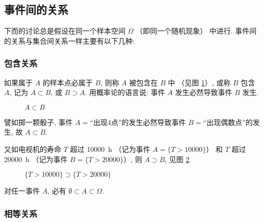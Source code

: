 \subsection{事件间的关系}

下而的讨论总是假设在同一个样本空间 $\Omega$ （即同一个随机现象） 中进行.
事件间的关系与集合间关系一样主要有以下几种:

\subsubsection{包含关系}

如果属于 $A$ 的样本点必属于 $B$,
则称 $A$ 被包含在 $B$ 中 （见图 \ref{fig1.1.2}）,
或称 $B$ 包含 $A$,
记为 $A \subset B$,
或 $B \supset A$.
用概率论的语言说:
事件 $A$ 发生必然导致事件 $B$ 发生.

\begin{figure}[!ht]
  \centering
  \caption{$A \subset B$}\label{fig1.1.2}
\end{figure}

譬如掷一颗骰子,
事件 $A=$“出现4点”的发生必然导致事件 $B=$“出现偶数点”的发生,
故 $ A \subset B$.

又如电视机的寿命 $T$ 超过 \SI{10000}{\hour} （记为事件 $A = \{T>10000\}$） 和 $T$ 超过 \SI{20000}{\hour} （记为事件 $B = \{T>20000\}$）,
则 $A \supset B$,
见图 \ref{fig1.1.3}.

\begin{figure}[!ht]
  \centering
{}
  \caption{$\{ T > 10000 \} \supset \{ T > 20000 \}$}\label{fig1.1.3}
\end{figure}

对任一事件 $A$,
必有 $ \emptyset \subset A \subset \Omega $.

\subsubsection{相等关系}

